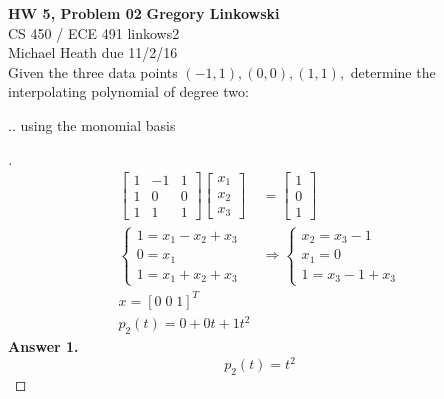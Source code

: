 \documentclass[12pt]{article}
\newenvironment{exercise}[2][Exercise]{\begin{trivlist}
\item[\hskip \labelsep {\bfseries #1}\hskip \labelsep {\bfseries #2.}]}{\end{trivlist}}
\begin{document}
\noindent
\large\textbf{HW 5, Problem 02} \hfill \textbf{Gregory Linkowski} \\
\normalsize CS 450 / ECE 491 \hfill linkows2 \\
Michael Heath \hfill due 11/2/16 \\


\vspace{5mm}
Given the three data points $(-1,1), (0,0), (1,1),$ determine the interpolating polynomial of degree two:
\vspace{-2mm} \\

\begin{exercise}{1}
	... using the monomial basis
\end{exercise} \vspace{-10mm}
\begin{proof}[]
	\begin{align*}
		\begin{bmatrix}	1 & -1 & 1 \\ 1 & 0 & 0 \\ 1 & 1 & 1	\end{bmatrix}
			\begin{bmatrix}	x_1 \\ x_2 \\ x_3 \end{bmatrix}
			&= \begin{bmatrix} 1 \\ 0 \\ 1	\end{bmatrix} \\[10pt]
		\begin{cases}
			1 = x_1 - x_2 + x_3 \\
			0 = x_1 \\
			1 = x_1 + x_2 + x_3
		\end{cases}
			& \Rightarrow \begin{cases}
				x_2 = x_3 - 1 \\
				x_1 = 0 \\
				1 = x_3 - 1 + x_3
			\end{cases} \\[10pt]
		x = [0 \; 0 \; 1]^T \\
		p_{2}(t) = 0 + 0t + 1t^2 
	\end{align*}
	\textbf{Answer 1.} \vspace{-7mm} \\
		\[ p_{2}(t) = t^2 \]
\end{proof}
\end{document}
